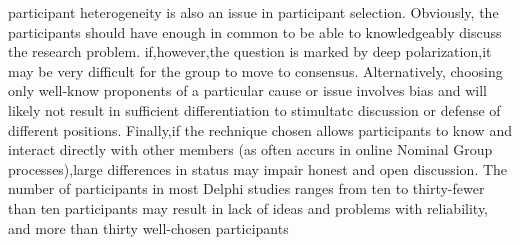 \documentclass[10pt,a4paper]{book}
\begin{document}
participant heterogeneity is also an issue in participant selection. Obviously, the participants should have enough in common to be able to knowledgeably discuss the research problem. if,however,the question is marked by deep polarization,it may be very difficult for the group to move to consensus. Alternatively, choosing only well-know proponents of a particular cause or issue involves bias and will likely not result in sufficient differentiation to stimultatc discussion or defense of different positions. Finally,if the rechnique chosen allows participants to know and interact directly with other members (as often accurs in online Nominal Group processes),large differences in status may impair honest and open discussion. The number of participants in most Delphi studies ranges from ten to thirty-fewer than ten participants may result in lack of ideas and problems with reliability, and more than thirty well-chosen participants
\end{document}
